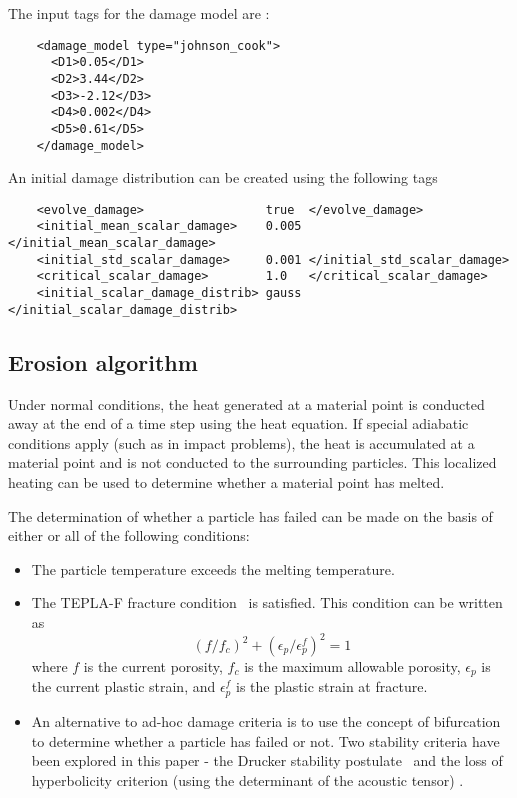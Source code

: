   The input tags for the damage model are :
  \lstset{language=XML}
  \begin{lstlisting}
    <damage_model type="johnson_cook">
      <D1>0.05</D1>
      <D2>3.44</D2>
      <D3>-2.12</D3>
      <D4>0.002</D4>
      <D5>0.61</D5>
    </damage_model>
  \end{lstlisting}

  An initial damage distribution can be created using the following tags
  \lstset{language=XML}
  \begin{lstlisting}
    <evolve_damage>                 true  </evolve_damage>
    <initial_mean_scalar_damage>    0.005  </initial_mean_scalar_damage>
    <initial_std_scalar_damage>     0.001 </initial_std_scalar_damage>
    <critical_scalar_damage>        1.0   </critical_scalar_damage>
    <initial_scalar_damage_distrib> gauss </initial_scalar_damage_distrib>
  \end{lstlisting}

  \subsection{Erosion algorithm}
  Under normal conditions, the heat generated at a material point is conducted 
  away at the end of a time step using the heat equation.  If special adiabatic 
  conditions apply (such as in impact problems), the heat is accumulated at a 
  material point and is not conducted to the surrounding particles.  This 
  localized heating can be used to determine whether a material point has
  melted.

  The determination of whether a particle has failed can be made on the 
  basis of either or all of the following conditions:
  \begin{itemize}
    \item The particle temperature exceeds the melting temperature.
    \item The TEPLA-F fracture condition~\cite{Johnson1988} is satisfied.
       This condition can be written as
       \begin{equation}
         (f/f_c)^2 + (\epsilon_p/\epsilon_p^f)^2 = 1
       \end{equation}
       where $f$ is the current porosity, $f_c$ is the maximum 
       allowable porosity, $\epsilon_p$ is the current plastic strain, and
       $\epsilon_p^f$ is the plastic strain at fracture.
    \item An alternative to ad-hoc damage criteria is to use the concept of 
       bifurcation to determine whether a particle has failed or not.  Two
       stability criteria have been explored in this paper - the Drucker
       stability postulate~\cite{Drucker1959} and the loss of hyperbolicity
       criterion (using the determinant of the acoustic tensor)
       \cite{Rudnicki1975,Perzyna1998}.  
  \end{itemize}

